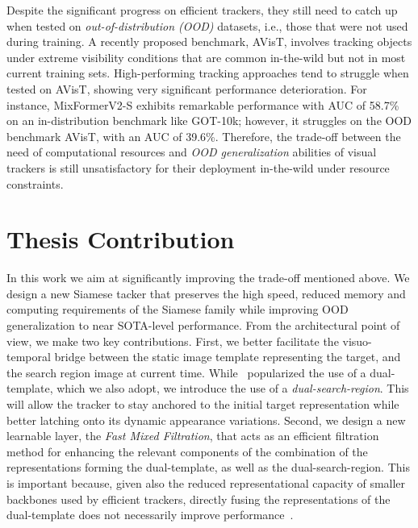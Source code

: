 Despite the significant progress on efficient trackers, they still need to catch up when tested on \emph{out-of-distribution (OOD)} datasets, i.e., those that were not used during training. A recently proposed benchmark, AVisT\cite{noman2022avist}, involves tracking objects under extreme visibility conditions that are common in-the-wild but not in most current training sets. High-performing tracking approaches tend to struggle when tested on AVisT, showing very significant performance deterioration. For instance, MixFormerV2-S exhibits remarkable performance with AUC of 58.7\% on an in-distribution benchmark like GOT-10k\cite{Huang2021}; however, it struggles on the OOD benchmark AVisT, with an AUC of 39.6\%. Therefore, the trade-off between the need of computational resources and \emph{OOD generalization} abilities of visual trackers is still unsatisfactory for their deployment in-the-wild under resource constraints.  


\section{Thesis Contribution}


In this work we aim at significantly improving the trade-off mentioned above. We design a new Siamese tacker that preserves the high speed, reduced memory and computing requirements of the Siamese family while improving OOD generalization to near SOTA-level performance. From the architectural point of view, we make two key contributions. First, we better facilitate the visuo-temporal bridge between the static image template representing the target, and the search region image at current time. While~\cite{borsuk2022fear} popularized the use of a dual-template, which we also adopt, we introduce the use of a \emph{dual-search-region}. This will allow the tracker to stay anchored to the initial target representation while better latching onto its dynamic appearance variations. Second, we design a new learnable layer, the \emph{Fast Mixed Filtration}, that acts as an efficient filtration method for enhancing the relevant components of the combination of the representations forming the dual-template, as well as the dual-search-region. This is important because, given also the reduced representational capacity of smaller backbones used by efficient trackers, directly fusing the representations of the dual-template does not necessarily improve performance~\cite{borsuk2022fear}.\\


